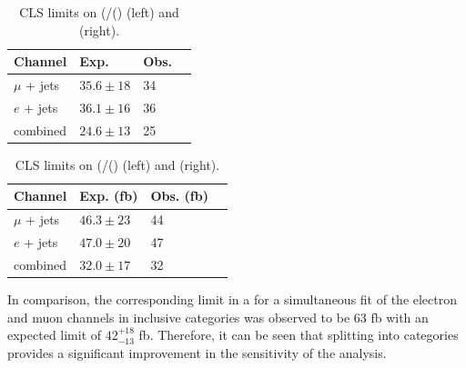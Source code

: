 {\begin{table}[ht!]
\centering
\begin{tabular}{| l | l | l | p{1cm} |}
 \hline 
 Channel & Exp.  &Obs. \\
   \hline
 $\mu$ + jets & $35.6\pm 18$ & 34 \\
  \hline
$e$ + jets &  $36.1\pm16$  & 36  \\
\hline
 combined & $24.6\pm13$  & 25   \\
\hline
\end{tabular}
\hspace{0.5cm}
\begin{tabular}{| l | l | l | p{1cm} |}
 \hline 
 Channel & Exp. (fb) &Obs. (fb) \\
   \hline
 $\mu$ + jets & $46.3\pm23$ & 44 \\
  \hline
$e$ + jets &  $47.0\pm20$  & 47  \\
\hline
 combined & $32.0\pm17$  & 32   \\
\hline
\end{tabular}
\caption{CLS limits on (\sigmatttt/(\sigmattttSM) (left) and \sigmatttt (right). }
\label{tab:lims}
\end{table}

In comparison, the corresponding limit in a  for a simultaneous fit of the electron and muon channels in inclusive \njets categories was observed to be 63 fb with an expected limit of  $42^{+18}_{-13}$ fb. Therefore, it can be seen that splitting into \njets categories provides a significant improvement in the sensitivity of the analysis.


}
